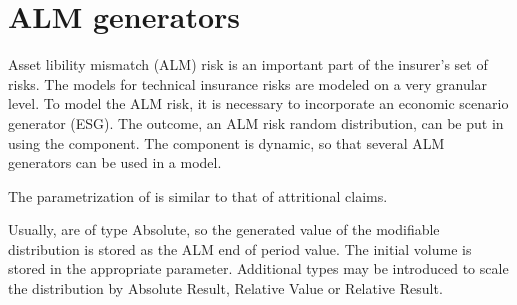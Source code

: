 \chapter{ALM generators}
\label{chap:ALMGenerators} 
Asset libility mismatch (ALM) risk is an important part of the insurer's set of risks. The models for technical insurance risks are modeled on a very granular level. To model the ALM risk, it is necessary to incorporate an economic scenario generator (ESG). The outcome, an ALM risk random distribution, can be put in \RA{} using the  component. The component is dynamic, so that several ALM generators can be used in a model.

The parametrization of  is similar to that of attritional claims. 

Usually,  are of type Absolute, so the generated value of the modifiable distribution is stored as the ALM end of period value. The initial volume is stored in the appropriate parameter. Additional types may be introduced to scale the distribution by Absolute Result, Relative Value or Relative Result.



